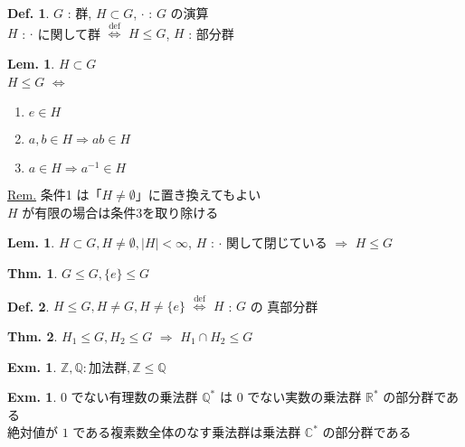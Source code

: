 \documentclass[uplatex,dvipdfmx,9pt]{beamer}
\newcommand{\defarrow}{\overset{\mathrm{def}}{\Leftrightarrow}}
\newcounter{textLemCount}
\newcounter{textExmCount}
\theoremstyle{definition} %
\newtheorem{defn}{Def.}[subsection] %
\newtheorem{thm}{Thm.}[subsection] %
\newtheorem{lemText}[textLemCount]{Lem.} %
\theoremstyle{example}
\newtheorem{exmText}[textExmCount]{Exm.}
\begin{document}
      \begin{frame}
        
        \begin{defn}
          $G$ : 群, $H \subset G$, $\cdot$ : $G$ の演算 \\
          $H$ : $\cdot$ に関して群  $\defarrow$ $H \le G$, $H$ : \alert{部分群}
        \end{defn}

        \begin{lemText}
          $H \subset G$ \\
          $H \le G$ $\Leftrightarrow$ \\
          \begin{enumerate}
            \item $e \in H$
            \item $a,b \in H \Rightarrow ab \in H$
            \item $a \in H \Rightarrow a^{-1} \in H$
          \end{enumerate}
        \end{lemText}
        \underline{Rem.} 条件1 は「$H \ne \emptyset$」に置き換えてもよい \\
        $H$ が有限の場合は条件3を取り除ける

        \begin{lemText}
          $H \subset G, H \ne \emptyset, |H| < \infty $, $H$ : $\cdot$ 関して閉じている $\Rightarrow$ $H \le G$
        \end{lemText}

      \end{frame}

      \begin{frame}

        \begin{thm}
          $G \le G, \{e\} \le G$
        \end{thm}
        
        \begin{defn}
          $H \le G, H \ne G, H \ne \{e\}$ $\defarrow$ $H$ : $G$ の \alert{真部分群}
        \end{defn}

        \begin{thm}
          $H_1 \le G, H_2 \le G$ $\Rightarrow$ $H_1 \cap H_2 \le G$
        \end{thm}

        \begin{exmText}
          $\mathbb{Z}, \mathbb{Q}: \text{加法群}, \mathbb{Z} \le \mathbb{Q}$
        \end{exmText}

        \begin{exmText}
          $0$ でない有理数の乗法群 $\mathbb{Q^*}$ は $0$ でない実数の乗法群 $\mathbb{R^*}$ の部分群である \\
          絶対値が $1$ である複素数全体のなす乗法群は乗法群 $\mathbb{C^*}$ の部分群である
        \end{exmText}

      \end{frame}
\end{document}
